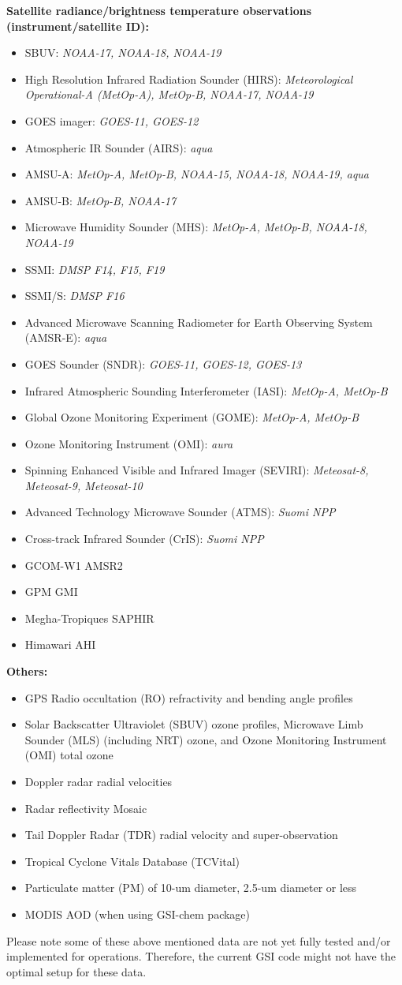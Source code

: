 \textbf{Satellite radiance/brightness temperature observations (instrument/satellite ID):}
\begin{itemize}
\item SBUV: \textit {NOAA-17, NOAA-18, NOAA-19}
\item High Resolution Infrared Radiation Sounder (HIRS): \textit {Meteorological Operational-A (MetOp-A), MetOp-B, NOAA-17, NOAA-19}
\item GOES imager: \textit {GOES-11, GOES-12}
\item Atmospheric IR Sounder (AIRS): \textit {aqua}
\item AMSU-A: \textit {MetOp-A, MetOp-B, NOAA-15, NOAA-18, NOAA-19, aqua} 
\item AMSU-B: \textit {MetOp-B, NOAA-17}
\item Microwave Humidity Sounder (MHS): \textit {MetOp-A, MetOp-B, NOAA-18, NOAA-19}
\item SSMI: \textit {DMSP F14, F15, F19}
\item SSMI/S: \textit {DMSP F16}
\item Advanced Microwave Scanning Radiometer for Earth Observing System (AMSR-E): \textit {aqua}
\item GOES Sounder (SNDR): \textit {GOES-11, GOES-12, GOES-13}
\item Infrared Atmospheric Sounding Interferometer (IASI): \textit {MetOp-A, MetOp-B}
\item Global Ozone Monitoring Experiment (GOME): \textit {MetOp-A, MetOp-B}
\item Ozone Monitoring Instrument (OMI): \textit {aura}
\item Spinning Enhanced Visible and Infrared Imager (SEVIRI): \textit {Meteosat-8, Meteosat-9, Meteosat-10}
\item Advanced Technology Microwave Sounder (ATMS): \textit {Suomi NPP}
\item Cross-track Infrared Sounder (CrIS): \textit {Suomi NPP}
\item GCOM-W1 AMSR2 
\item GPM GMI
\item Megha-Tropiques SAPHIR 
\item Himawari AHI
\end{itemize}

\textbf{Others:}
\begin{itemize}
\item GPS Radio occultation (RO) refractivity and bending angle profiles
\item Solar Backscatter Ultraviolet (SBUV) ozone profiles, Microwave Limb Sounder (MLS) (including NRT) ozone, and Ozone Monitoring Instrument (OMI) total ozone
\item Doppler  radar radial velocities
\item Radar reflectivity Mosaic
\item Tail Doppler Radar (TDR) radial velocity and super-observation
\item Tropical Cyclone Vitals Database (TCVital)
\item Particulate matter (PM) of 10-um diameter, 2.5-um diameter or less
\item MODIS AOD (when using GSI-chem package)
\end{itemize}\setlength{\parskip}{12pt}


Please note some of these above mentioned data are not yet fully tested and/or implemented for operations. Therefore, the current GSI code might not have the optimal setup for these data. 

